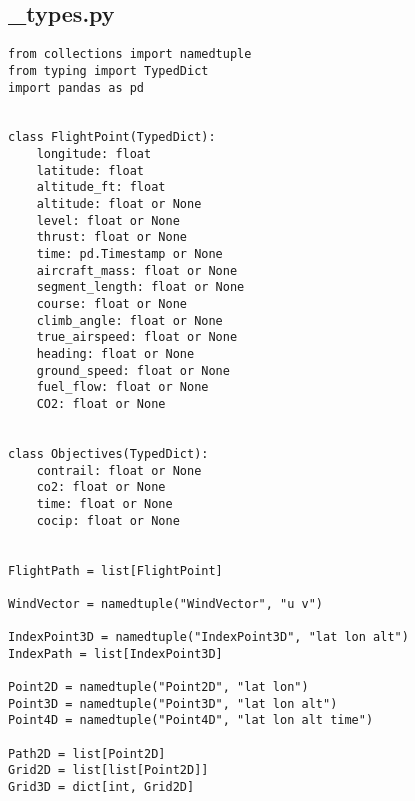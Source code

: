 \subsection{_types.py}
\begin{verbatim}
from collections import namedtuple
from typing import TypedDict
import pandas as pd


class FlightPoint(TypedDict):
    longitude: float
    latitude: float
    altitude_ft: float
    altitude: float or None
    level: float or None
    thrust: float or None
    time: pd.Timestamp or None
    aircraft_mass: float or None
    segment_length: float or None
    course: float or None
    climb_angle: float or None
    true_airspeed: float or None
    heading: float or None
    ground_speed: float or None
    fuel_flow: float or None
    CO2: float or None


class Objectives(TypedDict):
    contrail: float or None
    co2: float or None
    time: float or None
    cocip: float or None


FlightPath = list[FlightPoint]

WindVector = namedtuple("WindVector", "u v")

IndexPoint3D = namedtuple("IndexPoint3D", "lat lon alt")
IndexPath = list[IndexPoint3D]

Point2D = namedtuple("Point2D", "lat lon")
Point3D = namedtuple("Point3D", "lat lon alt")
Point4D = namedtuple("Point4D", "lat lon alt time")

Path2D = list[Point2D]
Grid2D = list[list[Point2D]]
Grid3D = dict[int, Grid2D]

\end{verbatim}
